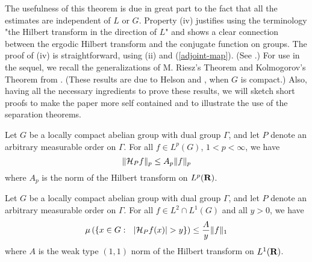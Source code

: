 The usefulness of this theorem
is due in great part to the fact that all the
estimates are independent of $L$ or $G$.
Property (iv) justifies using the terminology
"the Hilbert transform in the direction of 
$L$" and shows a clear 
connection between the ergodic Hilbert transform 
and the conjugate function on groups.  
The proof of (iv) is straightforward, 
using (ii) and (\ref{adjoint-map}).  (See
\cite[Theorem (6.7)]{ah}.) For use in the sequel,
we recall the generalizations of M. Riesz's
Theorem and Kolmogorov's Theorem from \cite{ah}.
(These results are due to Helson \cite{hel1} and \cite{hel2},
when $G$ is compact.)  
Also, having all the necessary ingredients to prove
these results, we will sketch short proofs
to make the paper more self contained
and to illustrate the use of the separation theorems.
\begin{generalized-m-riesz}
Let $G$ be a locally compact abelian group with 
dual group $\Gamma$, and let $P$ denote an arbitrary
measurable order on $\Gamma$. For all
$f\in L^p(G)$, $1<p<\infty$, we have
$$\|{\cal H}_P f\|_p\leq A_p \| f \|_p   $$
where $A_p$ is the norm of the Hilbert 
transform on $L^p(\R)$.
\label{generalized-m-riesz}
\end{generalized-m-riesz} 




\begin{generalized-kolmogorov}
Let $G$ be a locally compact abelian group with 
dual group $\Gamma$, and let $P$ denote an arbitrary
measurable order on $\Gamma$. For all
$f \in L^2 \cap L^1(G)$ 
and all $y>0$, we have
$$\mu\left(\{x\in G :\ \ | \H f(x)|>y\}\right)\leq
		\frac{A}{y} \|f\|_1$$
where $A$ is the weak type $(1,1)$ norm of the 
Hilbert transform on $L^1(\R)$.
\label{generalized-kolmogorov}
\end{generalized-kolmogorov}

